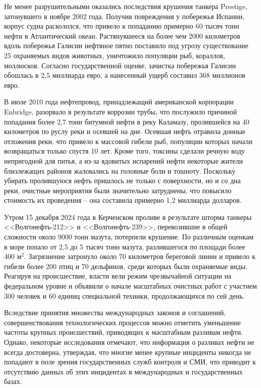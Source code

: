 Не менее разрушительными оказались последствия крушения танкера Prestige, затонувшего в ноябре 2002 года. Получив повреждения у побережья Испании, корпус судна раскололся, что привело к попаданию примерно 60 тысяч тонн нефти в Атлантический океан. Растянувшееся на более чем 2000 километров вдоль побережья Галисии нефтяное пятно поставило под угрозу существование 25 охраняемых видов животных, уничтожило популяции рыб, кораллов, моллюсков. Согласно государственной оценке, зачистка побережья Галисии обошлась в 2,5 миллиарда евро, а нанесенный ущерб составил 368 миллионов евро. 

В июле 2010 года нефтепровод, принадлежащий американской корпорации Enbridge, разорвало в результате коррозии трубы, что послужило причиной попадания более 2,7 тонн битумной нефти в реку Каламазу, пролившейся на 40 километров по руслу реки и осевшей на дне. Осевшая нефть отравила донные отложения реки, что привело к массовой гибели рыб, популяции которых начали возвращаться только спустя 10 лет. Кроме того, токсины сделали речную воду непригодной для питья, а из-за ядовитых испарений нефти некоторые жители близлежащих районов жаловались на головные боли и тошноту.  Поскольку убирать пролившуюся нефть пришлось не только с поверхности, но и со дна реки, очистные мероприятия были значительно затруднены, что повысило стоимость их проведения -- она составила примерно 1,2 миллиарда долларов.

Утром 15 декабря 2024 года в Керченском проливе в результате шторма танкеры <<Волгонефть-212>> и <<Волгонефть-239>>, перевозившие в общей сложности около 9000 тонн мазута, потерпели крушение. По различным оценкам в море попало от 2,5 до 5 тысяч тонн мазута, разлившегося по площади более 400 м$^{2} $. Загрязнение затронуло около 70 километров береговой линии и привело к гибели более 200 птиц и 70 дельфинов, среди которых были охраняемые виды. Реагируя на происшествие, власти вели режим чрезвычайной ситуации на федеральном уровне и объявили о начале масштабных очистных работ с участием 300 человек и 60 единиц специальной техники, продолжающихся по сей день.

Вследствие принятия множества международных законов и соглашений, совершенствования технологических процессов можно отметить уменьшение частоты крупных происшествий, приводящих к масштабным разливам нефти. Однако, некоторые исследования\cite{spill_db} отмечают, что информация о разливах нефти не всегда достоверна, утверждая, что многие менее крупные инциденты никогда не попадают в поле зрения государственных служб контроля и СМИ, что приводит к отсутствию данных об этих инцидентах в международных и государственных базах. 


